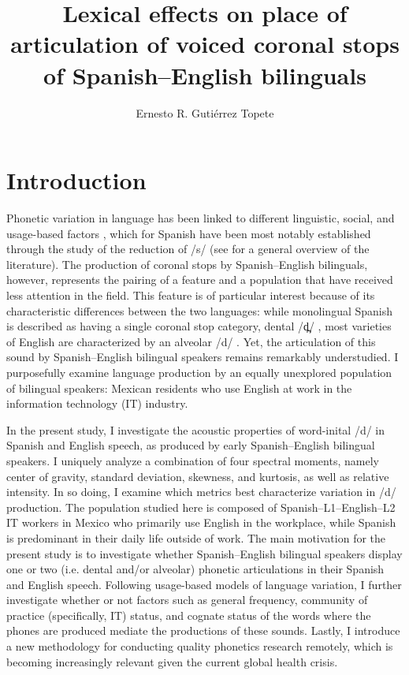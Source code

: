 \documentclass[output=paper,colorlinks,citecolor=brown,
]{langscibook}
\author{Ernesto R. Guti\'errez Topete\affiliation{University of California, Berkeley}}
\title{Lexical effects on place of articulation of voiced coronal stops of Spanish--English bilinguals}
\begin{document}
\maketitle

\section{Introduction}

Phonetic variation in language has been linked to different linguistic, social, and usage-based factors \citep{labov1994principles,labov2001principles,bybee2001phonology,pierrehumbert2001exemplar}, which for Spanish have been most notably established through the study of the reduction of /s/ (see \citealp{brown2008usage} for a general overview of the literature). The production of coronal stops by Spanish--English bilinguals, however, represents the pairing of a feature and a population that have received less attention in the field. This feature is of particular interest because of its characteristic differences between the two languages: while monolingual Spanish is described as having a single coronal stop category, dental /d̪/ \citep{hualde2005sounds}, most varieties of English are characterized by an alveolar /d/ \citep{hammond1999phonology}. Yet, the articulation of this sound by Spanish--English bilingual speakers remains remarkably understudied. I purposefully examine language production by an equally unexplored population of bilingual speakers: Mexican residents who use English at work in the information technology (IT) industry.

In the present study, I investigate the acoustic properties of word-inital /d/ in Spanish and English speech, as produced by early Spanish--English bilingual speakers. I uniquely analyze a combination of four spectral moments, namely center of gravity, standard deviation, skewness, and kurtosis, as well as relative intensity. In so doing, I examine which metrics best characterize variation in /d/ production. The population studied here is composed of Spanish--L1--English--L2 IT workers in Mexico who primarily use English in the workplace, while Spanish is predominant in their daily life outside of work. The main motivation for the present study is to investigate whether Spanish--English bilingual speakers display one or two (i.e. dental and/or alveolar) phonetic articulations in their Spanish and English speech. Following usage-based models of language variation, I further investigate whether or not factors such as general frequency, community of practice (specifically, IT) status, and cognate status of the words where the phones are produced mediate the productions of these sounds. Lastly, I introduce a new methodology for conducting quality phonetics research remotely, which is becoming increasingly relevant given the current global health crisis.
\end{document}
